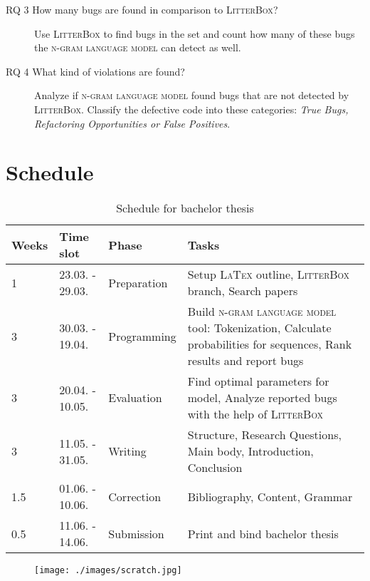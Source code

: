 \documentclass[
    numbers=noenddot,
    parskip=half-,
    fontsize=12pt,
    paper=a4,
    oneside,
    titlepage,
    bibliography=totoc,
    chapterprefix=false,
]{scrbook}
\newcommand{\latex}{\textsc{LaTex}}
\newcommand{\ngram}{\textsc{n-gram language model}}
\newcommand{\litterbox}{\textsc{LitterBox}}
\begin{document}
    \begin{description}
    	\item[RQ 3 How many bugs are found in comparison to \litterbox{}?] 
    	Use \litterbox{} to find bugs in the set and count how many of these bugs the \ngram{} can detect as well. 
        \item[RQ 4 What kind of violations are found?] 
        Analyze if \ngram{} found bugs that are not detected by \litterbox{}. Classify the defective code into these categories: \textit{True Bugs, Refactoring Opportunities or False Positives}. 
    \end{description}
 
 
 	\chapter{Schedule}\label{ch:schedule}
 	
 	\begin{table}[ht]
 		\label{tab:schedule}
 		\caption{Schedule for bachelor thesis}
 		\begin{tabular}{p{1cm}p{3cm}p{3cm}p{8cm}}
 			Weeks & Time slot & Phase & Tasks \\
 			\hline
 			1 & 23.03. - 29.03. & Preparation & Setup \latex{} outline, \litterbox{} branch, Search papers \\
 			3 & 30.03. - 19.04. & Programming & Build \ngram{} tool: Tokenization, Calculate probabilities for sequences, Rank results and report bugs\\
 			3 & 20.04. - 10.05. & Evaluation & Find optimal parameters for model, Analyze reported bugs with the help of \litterbox{}\\
 			3 & 11.05. - 31.05. & Writing & Structure, Research Questions, Main body, Introduction, Conclusion \\
 			1.5 & 01.06. - 10.06. & Correction & Bibliography, Content, Grammar \\
 			0.5 & 11.06. - 14.06. & Submission & Print and bind bachelor thesis\\
 			\hline
 		\end{tabular}
 	\end{table}
 
 	\begin{figure}
 		\centering
 		\texttt{[image: ./images/scratch.jpg]}
 	\end{figure}


    \backmatter

    \printbibliography
    
\end{document}

